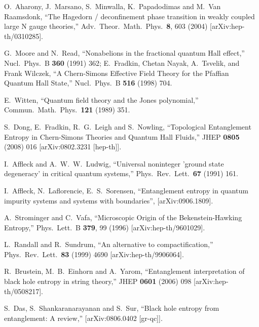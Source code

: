 \documentclass[12pt]{article}
\begin{document}
\begin{thebibliography}{99}
  O.~Aharony, J.~Marsano, S.~Minwalla, K.~Papadodimas and M.~Van Raamsdonk,
  ``The Hagedorn / deconfinement phase transition in weakly coupled large N
  gauge theories,''
  Adv.\ Theor.\ Math.\ Phys.\  {\bf 8}, 603 (2004)
  [arXiv:hep-th/0310285].


G.\ Moore and N.\ Read,
``Nonabelions in the fractional quantum Hall effect,''
Nucl.\ Phys.\ B \textbf{360} (1991) 362;
E.\ Fradkin, Chetan Nayak, A.\ Tsvelik, and Frank Wilczek,
``A Chern-Simons Effective Field Theory for the Pfaffian Quantum Hall State,''
Nucl.\ Phys.\ B \textbf{516} (1998) 704.


  E.~Witten,
  ``Quantum field theory and the Jones polynomial,''
  Commun.\ Math.\ Phys.\  {\bf 121} (1989) 351.


  S.~Dong, E.~Fradkin, R.~G.~Leigh and S.~Nowling,
  ``Topological Entanglement Entropy in Chern-Simons Theories and Quantum Hall
  Fluids,''
  JHEP {\bf 0805} (2008) 016
  [arXiv:0802.3231 [hep-th]].



  I.~Affleck and A.~W.~W.~Ludwig,
  ``Universal noninteger 'ground state degeneracy' in critical quantum
  systems,''
  Phys.\ Rev.\ Lett.\  {\bf 67} (1991) 161.
  
I.~Affleck, N.~Laflorencie, E.~S.~Sorensen,
``Entanglement entropy in quantum impurity systems and systems with boundaries'',
[arXiv:0906.1809].


  A.~Strominger and C.~Vafa,
  ``Microscopic Origin of the Bekenstein-Hawking Entropy,''
  Phys.\ Lett.\  B {\bf 379}, 99 (1996)
  [arXiv:hep-th/9601029].




  L.~Randall and R.~Sundrum,
  ``An alternative to compactification,''
  Phys.\ Rev.\ Lett.\  {\bf 83} (1999) 4690
  [arXiv:hep-th/9906064].


  R.~Brustein, M.~B.~Einhorn and A.~Yarom,
  ``Entanglement interpretation of black hole entropy in string theory,''
  JHEP {\bf 0601} (2006) 098
  [arXiv:hep-th/0508217].




  S.~Das, S.~Shankaranarayanan and S.~Sur,
  ``Black hole entropy from entanglement: A review,''
  [arXiv:0806.0402 [gr-qc]].




\end{thebibliography}
\end{document}
